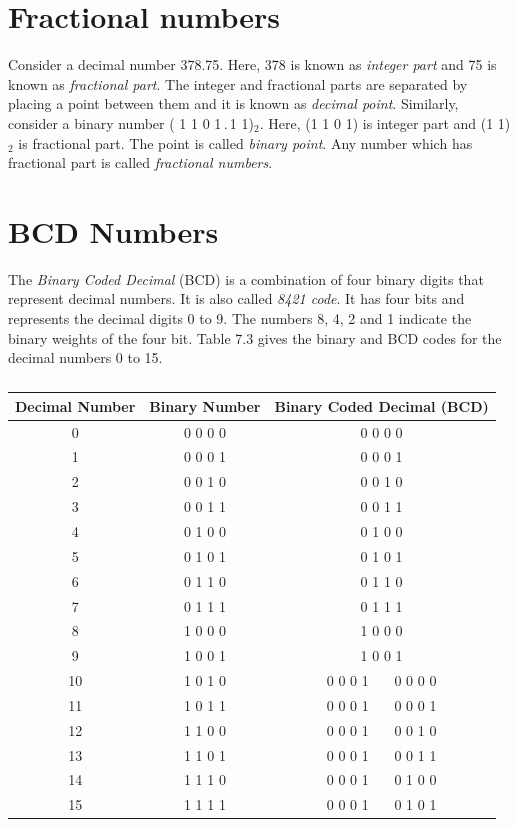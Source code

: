 \section{Fractional numbers}\label{sec5.9}

Consider a decimal number 378.75. Here, 378 is known as {\em integer part} and 75 is known as {\em fractional part}. The integer and fractional parts are separated by placing a point between them and it is known as {\em decimal point}. Similarly, consider a binary number ( 1 1 0 1\,.\,1 1)$_{2}$. Here, (1 1 0 1) is integer part and (1 1)$_{2}$ is fractional part. The point is called {\em binary point}. Any number which has fractional part is called {\em fractional numbers}.

\section{BCD Numbers}\label{sec5.10}

The {\em Binary Coded Decimal} (BCD) is a combination of four binary digits that represent decimal numbers. It is also called {\em 8421 code}. It has four bits and represents the decimal digits 0 to 9. The numbers 8, 4, 2 and 1 indicate the binary weights of the four bit. Table 7.3 gives the binary and BCD codes for the decimal numbers 0 to 15.
\begin{table}[H]
\centering
\caption{}\label{tab5.3}
\tabcolsep=12pt
\renewcommand{\arraystretch}{1.12}
\begin{tabular}{|c|c|c|}
\hline
{\bf Decimal Number} & {\bf Binary Number} & {\bf Binary Coded Decimal (BCD)}\\
\hline
0 & 0 0 0 0 & 0 0 0 0 \phantom{~~~ 0 0 0 0} \\
1 & 0 0 0 1 & 0 0 0 1 \phantom{~~~ 0 0 0 0} \\
2 & 0 0 1 0 & 0 0 1 0 \phantom{~~~ 0 0 0 0} \\
3 & 0 0 1 1 & 0 0 1 1 \phantom{~~~ 0 0 0 0} \\
4 & 0 1 0 0 & 0 1 0 0 \phantom{~~~ 0 0 0 0} \\
5 & 0 1 0 1 & 0 1 0 1 \phantom{~~~ 0 0 0 0} \\
6 & 0 1 1 0 & 0 1 1 0 \phantom{~~~ 0 0 0 0} \\
7 & 0 1 1 1 & 0 1 1 1 \phantom{~~~ 0 0 0 0} \\
8 & 1 0 0 0 & 1 0 0 0 \phantom{~~~ 0 0 0 0} \\
9 & 1 0 0 1 & 1 0 0 1 \phantom{~~~ 0 0 0 0} \\
10 & 1 0 1 0 & 0 0 0 1~~~ 0 0 0 0\\
11 & 1 0 1 1 & 0 0 0 1~~~ 0 0 0 1\\
12 & 1 1 0 0 & 0 0 0 1~~~ 0 0 1 0\\
13 & 1 1 0 1 & 0 0 0 1~~~ 0 0 1 1\\
14 & 1 1 1 0 & 0 0 0 1~~~ 0 1 0 0\\
15 & 1 1 1 1 & 0 0 0 1~~~ 0 1 0 1\\
\hline
\end{tabular}
\end{table}

